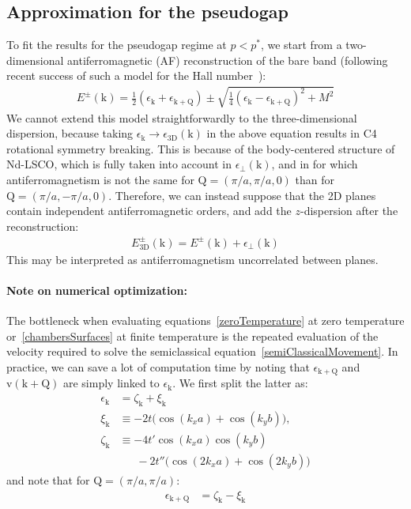 \documentclass[notitlepage,11pt,nofootinbib]{revtex4-1}
\renewcommand{\vec}[1]{\bm{\mathrm{#1}}}
\begin{document}
\subsection{Approximation for the pseudogap} 
To fit the results for the pseudogap regime at $p<p^*$, we start from a two-dimensional antiferromagnetic (AF) reconstruction of the bare band (following recent success of such a model for the Hall number~\cite{storey_hall_2016,verret_phenomenological_2017}):
\begin{align}
E^{\pm}(\vec k) 
= 
\tfrac{1}{2}(\epsilon_{\vec k}+\epsilon_{\vec k+\vec Q})
\pm \sqrt{
\tfrac{1}{4}(\epsilon_{\vec k}-\epsilon_{\vec k+\vec Q})^2 + M^2}
\end{align}
We cannot extend this model straightforwardly to the three-dimensional dispersion, because taking $\epsilon_{\vec k}\rightarrow\epsilon_{\text{3D}}(\vec k)$ in the above equation results in C4 rotational symmetry breaking. This is because of the body-centered structure of Nd-LSCO, which is fully taken into account in $\epsilon_\perp(\vec k)$, and in for which antiferromagnetism is not the same for $\vec Q=(\pi/a,\pi/a,0)$ than for $\vec Q=(\pi/a,-\pi/a,0)$. Therefore, we can instead suppose that the 2D planes contain independent antiferromagnetic orders, and add the $z$-dispersion after the reconstruction:  
\begin{align}
E^{\pm}_{\text{3D}}(\vec k)=E^{\pm}(\vec k)+\epsilon_{\perp}(\vec k)
\end{align}
This may be interpreted as antiferromagnetism uncorrelated between planes.

\paragraph*{Note on numerical optimization:}
The bottleneck when evaluating equations~\eqref{zeroTemperature} at zero temperature or~\eqref{chambersSurfaces} at finite temperature is the repeated evaluation of the velocity required to solve the semiclassical equation~\eqref{semiClassicalMovement}. In practice, we can save a lot of computation time by noting that $\epsilon_{\vec k+\vec Q}$ and $\vec v(\vec k+\vec Q)$ are simply linked to $\epsilon_{\vec k}$. We first split the latter as:
\begin{align}
\epsilon_{\vec k} &= \zeta_{\vec k} + \xi_{\vec k}
\\
\xi_{\vec k}
&\equiv
-2t\big(\cos (k_xa) + \cos (k_yb)\big),
\\
\zeta_{\vec k} 
&\equiv
-4t'\cos (k_xa)\cos (k_yb)
\nonumber \\
&\phantom{=\ }
-2t''\big(\cos (2k_xa)+\cos (2k_yb)\big)
\end{align}
and note that for $\vec Q=(\pi/a,\pi/a)$:
\begin{align}
\epsilon_{\vec k+\vec Q} &= \zeta_{\vec k} - \xi_{\vec k}
\end{align}
\end{document}
